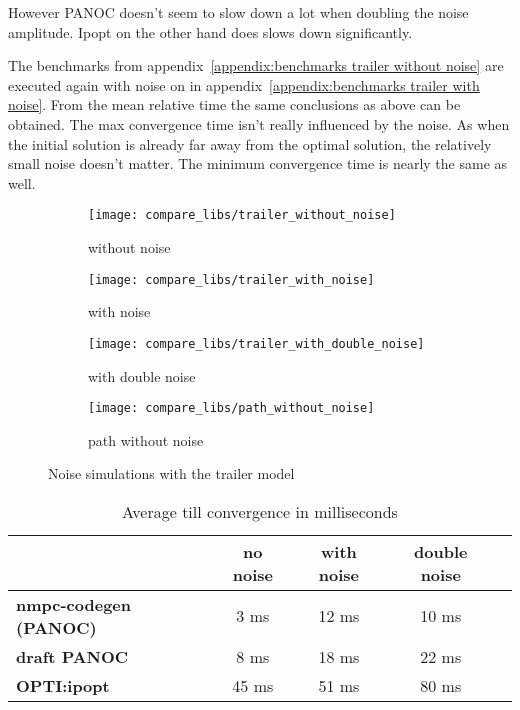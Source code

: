 However PANOC doesn't seem to slow down a lot when doubling the noise amplitude. Ipopt on the other hand does slows down significantly.

The benchmarks from appendix~\ref{appendix:benchmarks trailer without noise} are executed again with noise on in appendix~\ref{appendix:benchmarks trailer with noise}. From the mean relative time the same conclusions as above can be obtained. The max convergence time isn't really influenced by the noise. As when the initial solution is already far away from the optimal solution, the relatively small noise doesn't matter. The minimum convergence time is nearly the same as well. 

\begin{figure}[H]
	\centering
	\begin{subfigure}[b]{0.45\textwidth}
		\centering
		\texttt{[image: compare\_libs/trailer\_without\_noise]}
		\caption{without noise}
		\label{fig:timings trailer without noise}
	\end{subfigure}
	\hfill
	\begin{subfigure}[b]{0.45\textwidth}
		\centering
		\texttt{[image: compare\_libs/trailer\_with\_noise]}
		\caption{with noise}
		\label{fig:timings trailer with noise}
	\end{subfigure}
	\begin{subfigure}[b]{0.45\textwidth}
		\centering
		\texttt{[image: compare\_libs/trailer\_with\_double\_noise]}
		\caption{with double noise}
		\label{fig:timings trailer with double noise}
	\end{subfigure}
	\hfill
	\begin{subfigure}[b]{0.45\textwidth}
		\centering
		\texttt{[image: compare\_libs/path\_without\_noise]}
		\caption{path without noise}
		\label{fig:path noise simulations}
	\end{subfigure}
	\caption{Noise simulations with the trailer model}
	\label{fig:Noise simulations with the trailer model}
\end{figure}

\begin{table}[H]
	\centering
	\begin{tabular}{|l|c|c|c|c|}
		\hline
		&\textbf{no noise}&\textbf{with noise}&\textbf{double noise}\\\hline
		\textbf{nmpc-codegen (PANOC)}&3 ms&12 ms&10 ms \\\hline
		\textbf{draft PANOC}&8 ms&18 ms&22 ms \\\hline
		\textbf{OPTI:ipopt}&45 ms&51 ms&80 ms \\\hline
	\end{tabular}
	\caption{Average till convergence in milliseconds}
	\label{tbl:average till convergence noise}
\end{table}

